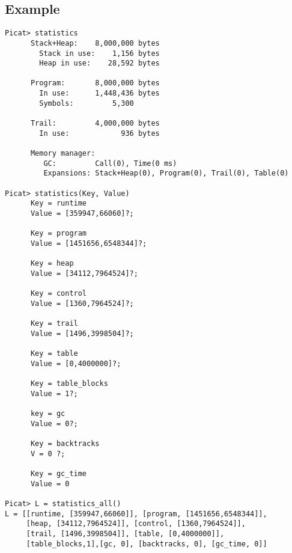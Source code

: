 \subsection*{Example}
\begin{verbatim}
Picat> statistics
      Stack+Heap:    8,000,000 bytes
        Stack in use:    1,156 bytes
        Heap in use:    28,592 bytes
      
      Program:       8,000,000 bytes
        In use:      1,448,436 bytes
        Symbols:         5,300
      
      Trail:         4,000,000 bytes
        In use:            936 bytes
      
      Memory manager:
         GC:         Call(0), Time(0 ms)
         Expansions: Stack+Heap(0), Program(0), Trail(0), Table(0)

Picat> statistics(Key, Value)
      Key = runtime
      Value = [359947,66060]?;

      Key = program
      Value = [1451656,6548344]?;

      Key = heap
      Value = [34112,7964524]?;

      Key = control
      Value = [1360,7964524]?;

      Key = trail
      Value = [1496,3998504]?;

      Key = table
      Value = [0,4000000]?;

      Key = table_blocks
      Value = 1?;

      key = gc
      Value = 0?;

      Key = backtracks
      V = 0 ?;

      Key = gc_time
      Value = 0 

Picat> L = statistics_all()
L = [[runtime, [359947,66060]], [program, [1451656,6548344]], 
     [heap, [34112,7964524]], [control, [1360,7964524]], 
     [trail, [1496,3998504]], [table, [0,4000000]], 
     [table_blocks,1],[gc, 0], [backtracks, 0], [gc_time, 0]]
\end{verbatim}

